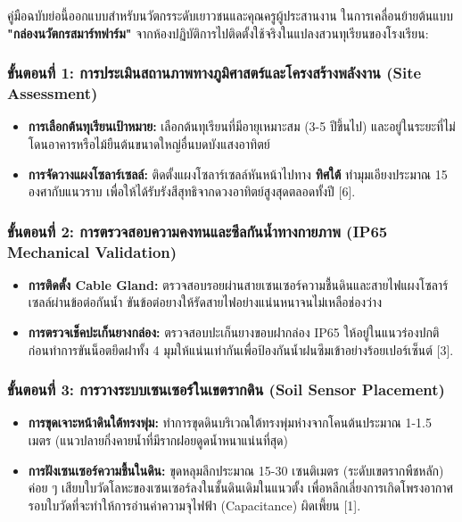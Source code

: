 \documentclass[11pt,a4paper,openany]{report}
\begin{document}
คู่มือฉบับย่อนี้ออกแบบสำหรับนวัตกรระดับเยาวชนและคุณครูผู้ประสานงาน ในการเคลื่อนย้ายต้นแบบ \textbf{"กล่องนวัตกรสมาร์ทฟาร์ม"} จากห้องปฏิบัติการไปติดตั้งใช้จริงในแปลงสวนทุเรียนของโรงเรียน:

\subsubsection{ขั้นตอนที่ 1: การประเมินสถานภาพทางภูมิศาสตร์และโครงสร้างพลังงาน (Site Assessment)}

\begin{itemize}
  \item \textbf{การเลือกต้นทุเรียนเป้าหมาย:} เลือกต้นทุเรียนที่มีอายุเหมาะสม (3-5 ปีขึ้นไป) และอยู่ในระยะที่ไม่โดนอาคารหรือไม้ยืนต้นขนาดใหญ่อื่นบดบังแสงอาทิตย์
  \item \textbf{การจัดวางแผงโซลาร์เซลล์:} ติดตั้งแผงโซลาร์เซลล์หันหน้าไปทาง \textbf{ทิศใต้} ทำมุมเอียงประมาณ 15 องศากับแนวราบ เพื่อให้ได้รับรังสีสุทธิจากดวงอาทิตย์สูงสุดตลอดทั้งปี [6].
\end{itemize}


\subsubsection{ขั้นตอนที่ 2: การตรวจสอบความคงทนและซีลกันน้ำทางกายภาพ (IP65 Mechanical Validation)}

\begin{itemize}
  \item \textbf{การติดตั้ง Cable Gland:} ตรวจสอบรอยผ่านสายเซนเซอร์ความชื้นดินและสายไฟแผงโซลาร์เซลล์ผ่านข้อต่อกันน้ำ ขันข้อต่อยางให้รัดสายไฟอย่างแน่นหนาจนไม่เหลือช่องว่าง
  \item \textbf{การตรวจเช็คปะเก็นยางกล่อง:} ตรวจสอบปะเก็นยางขอบฝากล่อง IP65 ให้อยู่ในแนวร่องปกติก่อนทำการขันน็อตยึดฝาทั้ง 4 มุมให้แน่นเท่ากันเพื่อป้องกันน้ำฝนซึมเข้าอย่างร้อยเปอร์เซ็นต์ [3].
\end{itemize}


\subsubsection{ขั้นตอนที่ 3: การวางระบบเซนเซอร์ในเขตรากดิน (Soil Sensor Placement)}

\begin{itemize}
  \item \textbf{การขุดเจาะหน้าดินใต้ทรงพุ่ม:} ทำการขุดดินบริเวณใต้ทรงพุ่มห่างจากโคนต้นประมาณ 1-1.5 เมตร (แนวปลายกิ่งคายน้ำที่มีรากฝอยดูดน้ำหนาแน่นที่สุด)
  \item \textbf{การฝังเซนเซอร์ความชื้นในดิน:} ขุดหลุมลึกประมาณ 15-30 เซนติเมตร (ระดับเขตรากพืชหลัก) ค่อย ๆ เสียบใบวัดโลหะของเซนเซอร์ลงในชั้นดินเดิมในแนวตั้ง เพื่อหลีกเลี่ยงการเกิดโพรงอากาศรอบใบวัดที่จะทำให้การอ่านค่าความจุไฟฟ้า (Capacitance) ผิดเพี้ยน [1].
\end{itemize}
\end{document}
